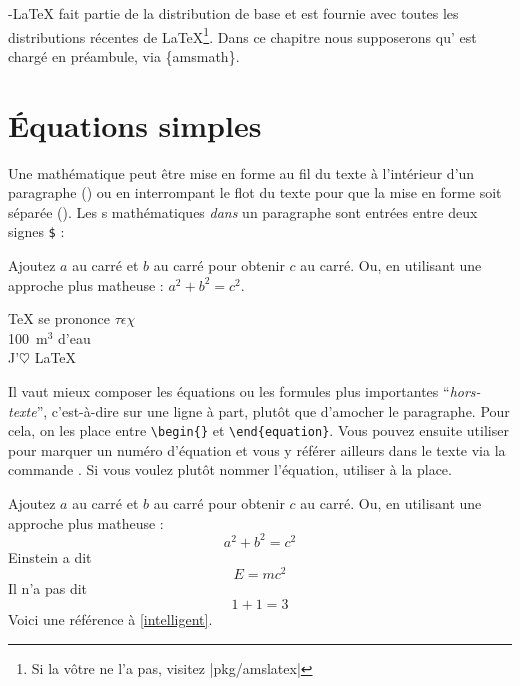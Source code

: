 \AmS-\LaTeX{} fait partie de la distribution de base et est fournie
avec toutes les distributions récentes de \LaTeX{}\footnote{Si la
  vôtre ne l'a pas, visitez
  \CTAN|pkg/amslatex|}. Dans ce chapitre nous
  supposerons qu' est chargé en préambule, via
  {\{amsmath\}}.

\section{Équations simples}

Une  mathématique peut être mise en forme
au fil du texte à l'intérieur d'un paragraphe
(\emph{}) ou en interrompant le flot du texte pour
que la mise en forme soit séparée (\textit{}). Les
s mathématiques \emph{dans} un paragraphe sont entrées
entre deux signes \index{$\iffalse$\fi @\texttt{\$}} \texttt{\$} :
\begin{example}
Ajoutez $a$ au carré
et $b$ au carré pour obtenir
$c$ au carré. Ou, en
utilisant une approche plus
matheuse : $a^2 + b^2 = c^2$.
\end{example}
\begin{example}
 \TeX{} se prononce
$\tau\epsilon\chi$\\[5pt]
100~m$^{3}$ d'eau\\[5pt]
J'$\heartsuit$ \LaTeX{}
\end{example}

Il vaut mieux composer les équations ou les formules plus importantes
\enquote{\emph{hors-texte}}, c'est-à-dire sur une ligne à part, plutôt que
d'amocher le paragraphe.  Pour cela, on les
place entre \verb|\begin{|\verb|}| et
\verb|\end{equation}|.
Vous pouvez ensuite utiliser  pour marquer un numéro
d'équation et vous y référer ailleurs dans le texte via la commande
. Si vous voulez plutôt nommer l'équation, utiliser 
à la place.

\begin{example}
Ajoutez $a$ au carré
et $b$ au carré pour obtenir
$c$ au carré. Ou, en
utilisant une approche plus
matheuse :
 \begin{equation}
   a^2 + b^2 = c^2
 \end{equation}
Einstein a dit
 \begin{equation}
   E = mc^2 \label{intelligent}
 \end{equation}
Il n'a pas dit
 \begin{equation}
  1 + 1 = 3 \tag{idiot}
 \end{equation}
Voici une référence à
\eqref{intelligent}.
\end{example}

